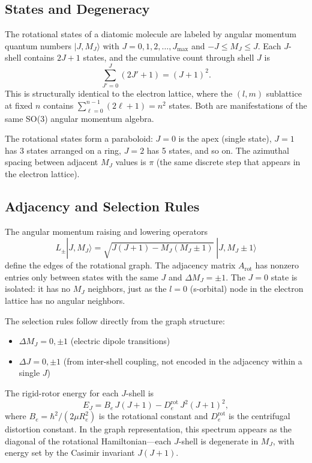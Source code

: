 \documentclass[aps,pra,twocolumn,superscriptaddress,longbibliography]{revtex4-2}
\begin{document}
\subsection{States and Degeneracy}

The rotational states of a diatomic molecule are labeled by angular
momentum quantum numbers $|J, M_J\rangle$ with
$J = 0, 1, 2, \ldots, J_{\max}$ and $-J \leq M_J \leq J$.  Each
$J$-shell contains $2J + 1$ states, and the cumulative count through
shell $J$ is
\begin{equation}
\sum_{J'=0}^{J} (2J' + 1) = (J + 1)^2.
\label{eq:rot_degeneracy}
\end{equation}
This is structurally identical to the electron lattice, where the
$(l, m)$ sublattice at fixed $n$ contains
$\sum_{\ell=0}^{n-1}(2\ell+1) = n^2$ states.  Both are manifestations
of the same SO(3) angular momentum algebra.

The rotational states form a paraboloid: $J = 0$ is the apex (single
state), $J = 1$ has 3 states arranged on a ring, $J = 2$ has 5 states,
and so on.  The azimuthal spacing between adjacent $M_J$ values is $\pi$
(the same discrete step that appears in the electron lattice).

\subsection{Adjacency and Selection Rules}

The angular momentum raising and lowering operators
\begin{equation}
L_\pm |J, M_J\rangle = \sqrt{J(J+1) - M_J(M_J \pm 1)}\;
|J, M_J \pm 1\rangle
\label{eq:lpm}
\end{equation}
define the edges of the rotational graph.  The adjacency matrix
$A_{\mathrm{rot}}$ has nonzero entries only between states with the same
$J$ and $\Delta M_J = \pm 1$.  The $J = 0$ state is isolated: it has no
$M_J$ neighbors, just as the $l = 0$ (s-orbital) node in the electron
lattice has no angular neighbors.

The selection rules follow directly from the graph structure:
\begin{itemize}
\item $\Delta M_J = 0, \pm 1$ (electric dipole transitions)
\item $\Delta J = 0, \pm 1$ (from inter-shell coupling, not encoded
  in the adjacency within a single $J$)
\end{itemize}

The rigid-rotor energy for each $J$-shell is
\begin{equation}
E_J = B_e\, J(J+1) - D_e^{\mathrm{rot}}\, J^2(J+1)^2,
\label{eq:rigid_rotor}
\end{equation}
where $B_e = \hbar^2/(2\mu R_e^2)$ is the rotational constant and
$D_e^{\mathrm{rot}}$ is the centrifugal distortion constant.  In the
graph representation, this spectrum appears as the diagonal of the
rotational Hamiltonian---each $J$-shell is degenerate in $M_J$, with
energy set by the Casimir invariant $J(J+1)$.
\end{document}
